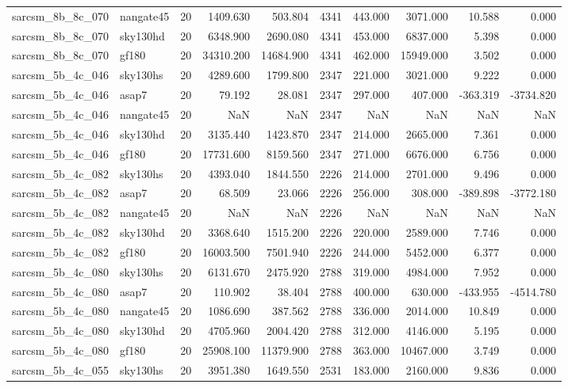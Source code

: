 \begin{tabular}{llrrrrrrrr}
sarcsm\_8b\_8c\_070 & nangate45 & 20 & 1409.630 & 503.804 & 4341 & 443.000 & 3071.000 & 10.588 & 0.000 \\
sarcsm\_8b\_8c\_070 & sky130hd & 20 & 6348.900 & 2690.080 & 4341 & 453.000 & 6837.000 & 5.398 & 0.000 \\
sarcsm\_8b\_8c\_070 & gf180 & 20 & 34310.200 & 14684.900 & 4341 & 462.000 & 15949.000 & 3.502 & 0.000 \\
sarcsm\_5b\_4c\_046 & sky130hs & 20 & 4289.600 & 1799.800 & 2347 & 221.000 & 3021.000 & 9.222 & 0.000 \\
sarcsm\_5b\_4c\_046 & asap7 & 20 & 79.192 & 28.081 & 2347 & 297.000 & 407.000 & -363.319 & -3734.820 \\
sarcsm\_5b\_4c\_046 & nangate45 & 20 & NaN & NaN & 2347 & NaN & NaN & NaN & NaN \\
sarcsm\_5b\_4c\_046 & sky130hd & 20 & 3135.440 & 1423.870 & 2347 & 214.000 & 2665.000 & 7.361 & 0.000 \\
sarcsm\_5b\_4c\_046 & gf180 & 20 & 17731.600 & 8159.560 & 2347 & 271.000 & 6676.000 & 6.756 & 0.000 \\
sarcsm\_5b\_4c\_082 & sky130hs & 20 & 4393.040 & 1844.550 & 2226 & 214.000 & 2701.000 & 9.496 & 0.000 \\
sarcsm\_5b\_4c\_082 & asap7 & 20 & 68.509 & 23.066 & 2226 & 256.000 & 308.000 & -389.898 & -3772.180 \\
sarcsm\_5b\_4c\_082 & nangate45 & 20 & NaN & NaN & 2226 & NaN & NaN & NaN & NaN \\
sarcsm\_5b\_4c\_082 & sky130hd & 20 & 3368.640 & 1515.200 & 2226 & 220.000 & 2589.000 & 7.746 & 0.000 \\
sarcsm\_5b\_4c\_082 & gf180 & 20 & 16003.500 & 7501.940 & 2226 & 244.000 & 5452.000 & 6.377 & 0.000 \\
sarcsm\_5b\_4c\_080 & sky130hs & 20 & 6131.670 & 2475.920 & 2788 & 319.000 & 4984.000 & 7.952 & 0.000 \\
sarcsm\_5b\_4c\_080 & asap7 & 20 & 110.902 & 38.404 & 2788 & 400.000 & 630.000 & -433.955 & -4514.780 \\
sarcsm\_5b\_4c\_080 & nangate45 & 20 & 1086.690 & 387.562 & 2788 & 336.000 & 2014.000 & 10.849 & 0.000 \\
sarcsm\_5b\_4c\_080 & sky130hd & 20 & 4705.960 & 2004.420 & 2788 & 312.000 & 4146.000 & 5.195 & 0.000 \\
sarcsm\_5b\_4c\_080 & gf180 & 20 & 25908.100 & 11379.900 & 2788 & 363.000 & 10467.000 & 3.749 & 0.000 \\
sarcsm\_5b\_4c\_055 & sky130hs & 20 & 3951.380 & 1649.550 & 2531 & 183.000 & 2160.000 & 9.836 & 0.000 \\

\end{tabular}
